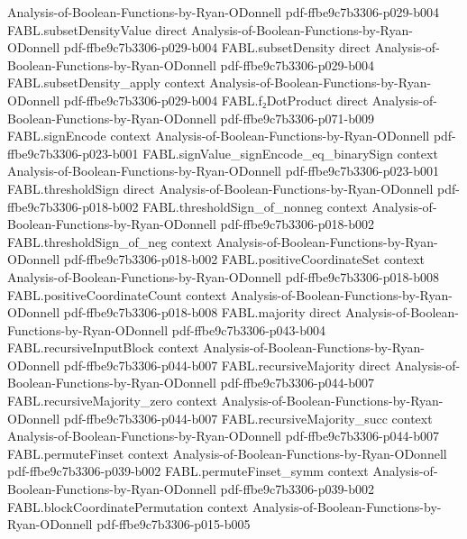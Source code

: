 \begin{theorem}
  {Analysis-of-Boolean-Functions-by-Ryan-ODonnell}
  {pdf-ffbe9c7b3306-p029-b004}
\proofstep
  {FABL.subsetDensityValue}
  {direct}
  {Analysis-of-Boolean-Functions-by-Ryan-ODonnell}
  {pdf-ffbe9c7b3306-p029-b004}
\proofstep
  {FABL.subsetDensity}
  {direct}
  {Analysis-of-Boolean-Functions-by-Ryan-ODonnell}
  {pdf-ffbe9c7b3306-p029-b004}
\proofstep
  {FABL.subsetDensity_apply}
  {context}
  {Analysis-of-Boolean-Functions-by-Ryan-ODonnell}
  {pdf-ffbe9c7b3306-p029-b004}
\proofstep
  {FABL.f₂DotProduct}
  {direct}
  {Analysis-of-Boolean-Functions-by-Ryan-ODonnell}
  {pdf-ffbe9c7b3306-p071-b009}
\proofstep
  {FABL.signEncode}
  {context}
  {Analysis-of-Boolean-Functions-by-Ryan-ODonnell}
  {pdf-ffbe9c7b3306-p023-b001}
\proofstep
  {FABL.signValue_signEncode_eq_binarySign}
  {context}
  {Analysis-of-Boolean-Functions-by-Ryan-ODonnell}
  {pdf-ffbe9c7b3306-p023-b001}
\proofstep
  {FABL.thresholdSign}
  {direct}
  {Analysis-of-Boolean-Functions-by-Ryan-ODonnell}
  {pdf-ffbe9c7b3306-p018-b002}
\proofstep
  {FABL.thresholdSign_of_nonneg}
  {context}
  {Analysis-of-Boolean-Functions-by-Ryan-ODonnell}
  {pdf-ffbe9c7b3306-p018-b002}
\proofstep
  {FABL.thresholdSign_of_neg}
  {context}
  {Analysis-of-Boolean-Functions-by-Ryan-ODonnell}
  {pdf-ffbe9c7b3306-p018-b002}
\proofstep
  {FABL.positiveCoordinateSet}
  {context}
  {Analysis-of-Boolean-Functions-by-Ryan-ODonnell}
  {pdf-ffbe9c7b3306-p018-b008}
\proofstep
  {FABL.positiveCoordinateCount}
  {context}
  {Analysis-of-Boolean-Functions-by-Ryan-ODonnell}
  {pdf-ffbe9c7b3306-p018-b008}
\proofstep
  {FABL.majority}
  {direct}
  {Analysis-of-Boolean-Functions-by-Ryan-ODonnell}
  {pdf-ffbe9c7b3306-p043-b004}
\proofstep
  {FABL.recursiveInputBlock}
  {context}
  {Analysis-of-Boolean-Functions-by-Ryan-ODonnell}
  {pdf-ffbe9c7b3306-p044-b007}
\proofstep
  {FABL.recursiveMajority}
  {direct}
  {Analysis-of-Boolean-Functions-by-Ryan-ODonnell}
  {pdf-ffbe9c7b3306-p044-b007}
\proofstep
  {FABL.recursiveMajority_zero}
  {context}
  {Analysis-of-Boolean-Functions-by-Ryan-ODonnell}
  {pdf-ffbe9c7b3306-p044-b007}
\proofstep
  {FABL.recursiveMajority_succ}
  {context}
  {Analysis-of-Boolean-Functions-by-Ryan-ODonnell}
  {pdf-ffbe9c7b3306-p044-b007}
\proofstep
  {FABL.permuteFinset}
  {context}
  {Analysis-of-Boolean-Functions-by-Ryan-ODonnell}
  {pdf-ffbe9c7b3306-p039-b002}
\proofstep
  {FABL.permuteFinset_symm}
  {context}
  {Analysis-of-Boolean-Functions-by-Ryan-ODonnell}
  {pdf-ffbe9c7b3306-p039-b002}
\proofstep
  {FABL.blockCoordinatePermutation}
  {context}
  {Analysis-of-Boolean-Functions-by-Ryan-ODonnell}
  {pdf-ffbe9c7b3306-p015-b005}

\end{theorem}
